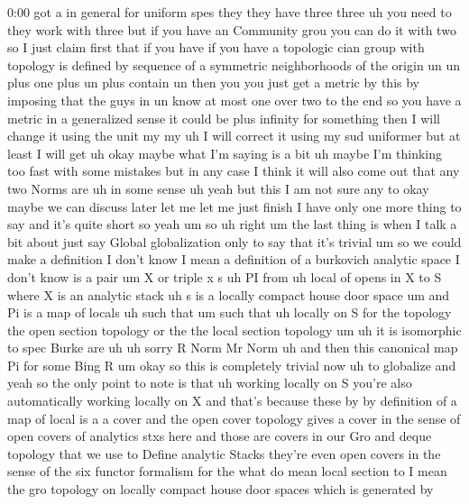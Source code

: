 \begin{unfinished}{0:00}
got  a  in  general  for  uniform  spes  they
they  have  three  three  uh  you  need  to
they  work  with  three  but  if  you  have  an
Community  grou  you  can  do  it  with  two  so
I  just  claim  first  that  if  you  have  if
you  have  a  topologic  cian  group  with
topology  is  defined  by  sequence  of  a
symmetric  neighborhoods  of  the  origin  un
un  plus  one  plus  un  plus  contain  un  then
you  you  just  get  a  metric  by  this  by
imposing  that  the  guys  in  un  know  at
most  one  over  two  to  the  end  so  you  have
a  metric  in  a  generalized  sense  it  could
be  plus  infinity  for  something  then  I
will  change  it  using  the  unit
my  my  uh  I  will  correct  it  using  my  sud
uniformer  but  at  least  I  will
get  uh  okay  maybe  what  I'm  saying  is  a
bit  uh  maybe  I'm  thinking  too  fast  with
some  mistakes  but  in  any  case  I  think  it
will  also  come  out  that  any  two
Norms
are  uh  in  some  sense
uh  yeah  but  this  I  am  not  sure  any
to  okay  maybe  we  can  discuss  later  let
me  let  me  just  finish  I  have  only  one
more  thing  to  say  and  it's  quite  short
so  yeah
um  so  uh  right  um  the  last  thing  is  when
I  talk  a  bit  about  just  say  Global
globalization  only  to  say  that  it's
trivial
um  so  we  could  make  a  definition  I  don't
know  I  mean  a  definition  of  a
burkovich  analytic  space  I  don't
know  is  a  pair
um  X  or
triple  x  s  uh  PI  from  uh  local  of  opens
in  X  to  S  where  X  is  an  analytic
stack  uh  s  is  a  locally  compact  house
door
space  um  and  Pi  is  a  map  of
locals  uh
such
that
um  such  that  uh  locally  on
S  for  the
topology  the  open  section  topology  or
the  the  local  section
topology
um  uh  it  is
isomorphic
to  spec
Burke  are  uh  uh  sorry  R
Norm  Mr  Norm  uh  and  then  this  canonical
map  Pi  for
some
Bing
R
um  okay  so  this
is  completely  trivial  now  uh  to
globalize  and  yeah  so  the  only  point  to
note  is  that  uh  working  locally  on  S
you're  also  automatically  working
locally  on  X  and  that's  because  these  by
by  definition  of  a  map  of  local  is  a  a
cover  and  the  open  cover  topology  gives
a  cover  in  the  sense  of  open  covers  of
analytics  stxs  here  and  those  are  covers
in  our  Gro  and  deque  topology  that  we
use  to  Define  analytic  Stacks  they're
even  open  covers  in  the  sense  of  the  six
functor  formalism  for
the  what  do  mean  local  section  to  I  mean
the  gro  topology  on  locally  compact
house  door  spaces  which  is  generated  by

\end{unfinished}
